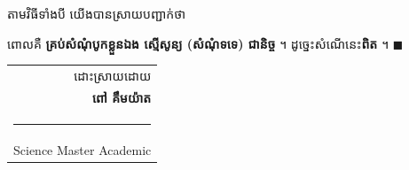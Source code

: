 \documentclass[12pt,a4paper]{article}
\newcommand{\keyformula}[1]{%
  \begin{center}\tcbox[enhanced,colback=white,colframe=crimson,boxrule=1.2pt,
    arc=4pt,left=10pt,right=10pt,top=4pt,bottom=4pt]{$\displaystyle #1$}\end{center}}
\begin{document}
\vspace{0.8em}
\begin{conclusion}
តាមវិធីទាំងបី យើងបានស្រាយបញ្ជាក់ថា
\keyformula{\forall A,\qquad A + A = \varnothing}
ពោលគឺ \textbf{គ្រប់សំណុំបូកខ្លួនឯង ស្មើសូន្យ (សំណុំទទេ) ជានិច្ច} ។
ដូច្នេះសំណើនេះ\textbf{\color{crimson}ពិត} ។ \hfill{\color{gold}$\blacksquare$}
\end{conclusion}

\vspace{1.2cm}
\begin{flushright}
\begin{tabular}{r}
{\color{inkgray}ដោះស្រាយដោយ}\\
{\large\bfseries\color{navy}ពៅ គឹមយ៉ាត}\\
{\color{gold}\rule{4.5cm}{1pt}}\\
{\small\color{teal}Science Master Academic}
\end{tabular}
\end{flushright}
\end{document}
